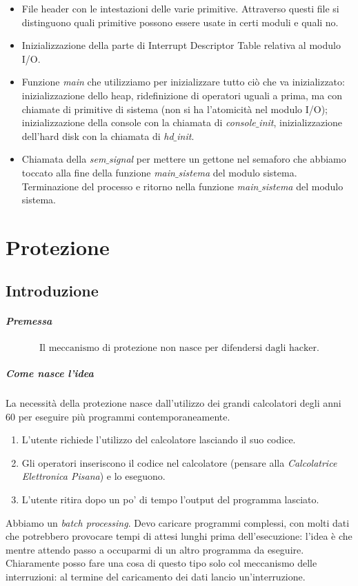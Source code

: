 \documentclass[11pt]{report}
\theoremstyle{definition}
\begin{document}
\begin{itemize}
\begin{itemize}
\begin{itemize}
			\item File header con le intestazioni delle varie primitive. Attraverso questi file si distinguono quali primitive possono essere usate in certi moduli e quali no.
			\item Inizializzazione della parte di Interrupt Descriptor Table relativa al modulo I/O.
			\item Funzione \emph{main} che utilizziamo per inizializzare tutto ciò che va inizializzato: inizializzazione dello heap, ridefinizione di operatori uguali a prima, ma con chiamate di primitive di sistema (non si ha l'atomicità nel modulo I/O); inizializzazione della console con la chiamata di \emph{console$\_$init}, inizializzazione dell'hard disk con la chiamata di \emph{hd$\_$init}.
			\item Chiamata della \emph{sem$\_$signal} per mettere un gettone nel semaforo che abbiamo toccato alla fine della funzione \emph{main$\_$sistema} del modulo sistema. Terminazione del processo e ritorno nella funzione \emph{main$\_$sistema} del modulo sistema.
		\end{itemize}
	\end{itemize}
\end{itemize}


\chapter{Protezione}
\section{Introduzione}
\paragraph{Premessa} \[\boxed{\text{Il meccanismo di protezione non nasce per difendersi dagli hacker.}}\]
\paragraph{Come nasce l'idea} La necessità della protezione nasce dall'utilizzo dei grandi calcolatori degli anni $60$ per eseguire più programmi contemporaneamente. 
\begin{enumerate}
	\item L'utente richiede l'utilizzo del calcolatore lasciando il suo codice.
	\item Gli operatori inseriscono il codice nel calcolatore (pensare alla \emph{Calcolatrice Elettronica Pisana}) e lo eseguono.
	\item L'utente ritira dopo un po' di tempo l'output del programma lasciato.
\end{enumerate}
Abbiamo un \emph{batch processing}. Devo caricare programmi complessi, con molti dati che potrebbero provocare tempi di attesi lunghi prima dell'esecuzione: l'idea è che mentre attendo passo a occuparmi di un altro programma da eseguire. Chiaramente posso fare una cosa di questo tipo solo col meccanismo delle interruzioni: al termine del caricamento dei dati lancio un'interruzione. 
\end{document}
